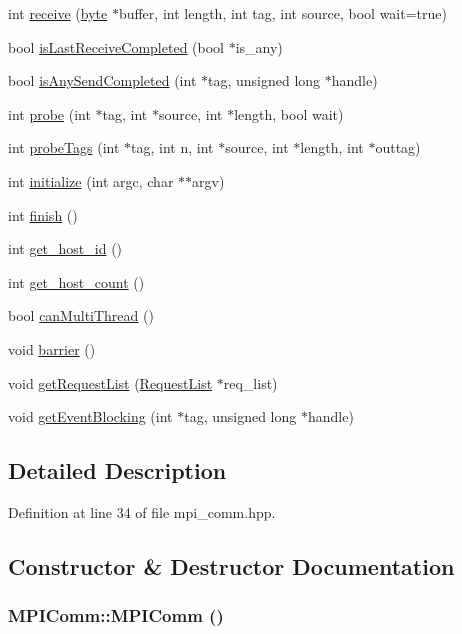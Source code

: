 \begin{DoxyCompactItemize}
int \hyperlink{class_m_p_i_comm_abdd86a365a50571e7a46e8593c45977b}{receive} (\hyperlink{engine_8hpp_a0c8186d9b9b7880309c27230bbb5e69d}{byte} $\ast$buffer, int length, int tag, int source, bool wait=true)
\item 
bool \hyperlink{class_m_p_i_comm_a26ebe2409a5fea582918a00896c067e9}{isLastReceiveCompleted} (bool $\ast$is\_\-any)
\item 
bool \hyperlink{class_m_p_i_comm_ab56666a8c492a8d53065def42a488d72}{isAnySendCompleted} (int $\ast$tag, unsigned long $\ast$handle)
\item 
int \hyperlink{class_m_p_i_comm_a1c1a72b9cf6cac8a5af0e8dc6a085c87}{probe} (int $\ast$tag, int $\ast$source, int $\ast$length, bool wait)
\item 
int \hyperlink{class_m_p_i_comm_a5e2fdc3d30c9e2ef04fc81fa99e8cd3f}{probeTags} (int $\ast$tag, int n, int $\ast$source, int $\ast$length, int $\ast$outtag)
\item 
int \hyperlink{class_m_p_i_comm_afd22e4e486b60da08f0b783c18ca0e2b}{initialize} (int argc, char $\ast$$\ast$argv)
\item 
int \hyperlink{class_m_p_i_comm_a96c71e22fbaac04771dffb5791e06692}{finish} ()
\item 
int \hyperlink{class_m_p_i_comm_a856e93fd17d9e20104590440088b4049}{get\_\-host\_\-id} ()
\item 
int \hyperlink{class_m_p_i_comm_a991f93012b8d83f7ca54fc780555c683}{get\_\-host\_\-count} ()
\item 
bool \hyperlink{class_m_p_i_comm_a42d5d0b9d3a804931b2a58c468e08d0d}{canMultiThread} ()
\item 
void \hyperlink{class_m_p_i_comm_ad52e37d83780b3f42ab18c3314c9d54f}{barrier} ()
\item 
void \hyperlink{class_m_p_i_comm_a56487e629b2877138f00cb01dfcfee08}{getRequestList} (\hyperlink{struct_request_list}{RequestList} $\ast$req\_\-list)
\item 
void \hyperlink{class_m_p_i_comm_a973e8bc1426f2ac24f86036909eb2407}{getEventBlocking} (int $\ast$tag, unsigned long $\ast$handle)
\end{DoxyCompactItemize}


\subsection{Detailed Description}


Definition at line 34 of file mpi\_\-comm.hpp.

\subsection{Constructor \& Destructor Documentation}
\hypertarget{class_m_p_i_comm_a2795c73e5730d893f195efa58e06ee8d}{
\subsubsection[{MPIComm}]{\setlength{\rightskip}{0pt plus 5cm}MPIComm::MPIComm ()}}
\label{class_m_p_i_comm_a2795c73e5730d893f195efa58e06ee8d}


